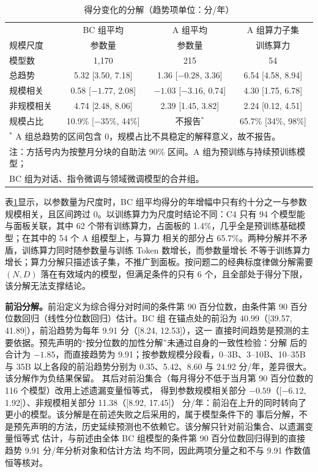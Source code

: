 \begin{table}[htbp]
  \centering
  \caption{得分变化的分解（趋势项单位：分/年）}
  \label{tab:q4-decomp}
  \begin{tabular}{lccc}
    \toprule
     & BC 组平均 & A 组平均 & A 组算力子集 \\
    规模尺度 & 参数量 & 参数量 & 训练算力 \\
    模型数 & 1,170 & 215 & 54 \\
    \midrule
    总趋势 & 5.32 [3.50, 7.18] & 1.36 [$-0.28$, 3.36] & 6.54 [4.58, 8.94] \\
    规模相关 & 0.58 [$-1.77$, 2.08] & $-1.03$ [$-3.16$, 0.74] & 4.30 [1.75, 6.78] \\
    非规模相关 & 4.74 [2.48, 8.06] & 2.39 [1.45, 3.82] & 2.24 [0.12, 4.51] \\
    规模占比 & 10.9\% [$-35$\%, 44\%] & 不报告$^{*}$ & 65.7\% [34\%, 98\%] \\
    \bottomrule
    \multicolumn{4}{l}{\footnotesize $^{*}$ A 组总趋势的区间包含 0，规模占比不具稳定的解释意义，故不报告。} \\
    \multicolumn{4}{l}{\footnotesize 注：方括号内为按整月分块的自助法 90\% 区间。A 组为预训练与持续预训练模型；} \\
    \multicolumn{4}{l}{\footnotesize \phantom{注：}BC 组为对话、指令微调与领域微调模型的合并组。} \\
  \end{tabular}
\end{table}

表\ref{tab:q4-decomp}显示，以参数量为尺度时，BC 组平均得分的年增幅中只有约十分之一与参数
规模相关，且区间跨过 0。以训练算力为尺度时结论不同：C4 只有 94 个模型能与面板关联，其中
62 个带有训练算力，占面板的 1.4\%，几乎全是预训练基础模型；在其中的 54 个 A 组模型上，与算力
相关的部分占 65.7\%。两种分解并不矛盾，训练算力同时随参数量与训练 Token 数增长，而参数量增长
不等于训练算力增长；算力分解只描述该子集，不推广到面板。按问题二的经典标度律做分解需要
$(N,D)$ 落在有效域内的模型，但满足条件的只有 6 个，且全部处于得分下限，该分解无法支撑结论。

\textbf{前沿分解。}前沿定义为综合得分对时间的条件第 90 百分位数，由条件第 90 百分位数回归（线性分位数回归）估计。BC 组
在锚点处的前沿为 40.99（[39.57, 41.89]），前沿趋势为每年 9.91 分（[8.24, 12.53]），这一
直接时间趋势是预测的主要依据。预先声明的“按分位数的加性分解”未通过自身的一致性检验：分解
后的合计为 $-1.85$，而直接趋势为 9.91；按参数规模分段看，0--3B、3--10B、10--35B 与 35B
以上各段的前沿趋势分别为 0.35、5.42、8.60 与 24.92 分/年，差异很大。该分解作为负结果保留。
其后对前沿集合（每月得分不低于当月第 90 百分位数的 116 个模型）改用上述遗漏变量恒等式，
得到参数规模相关部分 $-0.59$（[$-6.12$, 1.92]）、非规模相关部分 11.38（[8.92, 17.45]）
分/年：前沿在上升的同时转向了更小的模型。该分解是在前述失败之后采用的，属于模型条件下的
事后分解，不是预先声明的方法，历史延续预测也不依赖它。该分解只针对前沿集合、以遗漏变量恒等式
估计，与前述由全体 BC 组模型的条件第 90 百分位数回归得到的直接趋势 9.91 分/年分析对象和估计方法
均不同，因此两项分量之和不与 9.91 作数值恒等核对。

